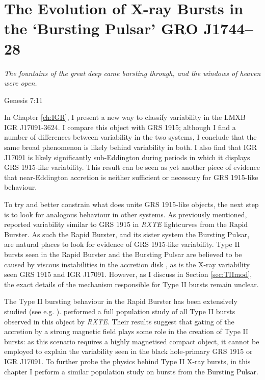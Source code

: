 
\chapter{The Evolution of X-ray Bursts in the `Bursting Pulsar' GRO J1744--28}

\label{ch:BPbig}

\epigraph{\textit{The fountains of the great deep came bursting through, and the windows of heaven were open.}}{Genesis 7:11}
\vspace{1cm}

\par\noindent In Chapter \ref{ch:IGR}, I present a new way to classify variability in the LMXB IGR J17091-3624.  I compare this object with GRS 1915; although I find a number of differences between variability in the two systems, I conclude that the same broad phenomenon is likely behind variability in both.  I also find that IGR J17091 is likely significantly sub-Eddington during periods in which it displays GRS 1915-like variability.  This result can be seen as yet another piece of evidence that near-Eddington accretion is neither sufficient or necessary for GRS 1915-like behaviour.
\par To try and better constrain what does unite GRS 1915-like objects, the next step is to look for analogous behaviour in other systems.  As previously mentioned, \citet{Bagnoli_RB} reported variability similar to GRS 1915 in \indexrxte\textit{RXTE} lightcurves from the Rapid Burster.  As such the Rapid Burster, and its sister system the Bursting Pulsar, are natural places to look for evidence of GRS 1915-like variability.  Type II bursts seen in the Rapid Burster and the Bursting Pulsar are believed to be caused by viscous instabilities in the accretion disk \citep{Lewin_TypeII}, as is the X-ray variability seen GRS 1915 and IGR J17091.  However, as I discuss in Section \ref{sec:TIImod}, the exact details of the mechanism responsible for Type II bursts remain unclear.
\par The Type II bursting behaviour in the Rapid Burster has been extensively studied (see e.g. \citealp{Lewin_TypeII,Hoffman_RB}).  \citet{Bagnoli_PopStudy} performed a full population study of all Type II bursts observed in this object by \textit{RXTE}.  Their results suggest that gating of the accretion by a strong magnetic field plays some role in the creation of Type II bursts: as this scenario requires a highly magnetised compact object, it cannot be employed to explain the variability seen in the black hole-primary GRS 1915 or IGR J17091.  To further probe the physics behind Type II X-ray bursts, in this chapter I perform a similar population study on bursts from the Bursting Pulsar.
